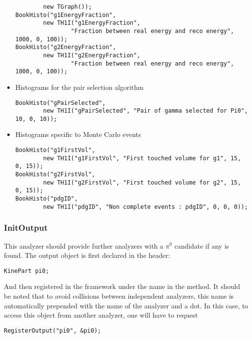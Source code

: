 \begin{itemize}
\begin{lstlisting}
		new TGraph());
BookHisto("g1EnergyFraction", 
		new TH1I("g1EnergyFraction", 
				"Fraction between real energy and reco energy",	1000, 0, 100));
BookHisto("g2EnergyFraction", 
		new TH1I("g2EnergyFraction", 
				"Fraction between real energy and reco energy",	1000, 0, 100));
\end{lstlisting}
	\item Histograms for the pair selection algorithm
\begin{lstlisting}
BookHisto("gPairSelected", 
		new TH1I("gPairSelected", "Pair of gamma selected for Pi0", 10, 0, 10));
\end{lstlisting}
	\item Histograms specific to Monte Carlo events
\begin{lstlisting}
BookHisto("g1FirstVol", 
		new TH1I("g1FirstVol", "First touched volume for g1", 15, 0, 15));
BookHisto("g2FirstVol", 
		new TH1I("g2FirstVol", "First touched volume for g2", 15, 0, 15));
BookHisto("pdgID", 
		new TH1I("pdgID", "Non complete events : pdgID", 0, 0, 0));
\end{lstlisting}
\end{itemize}

\subsubsection{InitOutput}
This analyzer should provide further analyzers with a $\pi^0$ candidate if any is found. The output
object is first declared in the header:

\begin{lstlisting}
KinePart pi0;
\end{lstlisting}

And then registered in the framework under the name  in the 
method. It should be noted that to avoid collisions between independent analyzers, this name is
automatically prepended with the name of the analyzer and a dot. In this case, to access this
object from another analyzer, one will have to request 
\begin{lstlisting}
RegisterOutput("pi0", &pi0);
\end{lstlisting}

